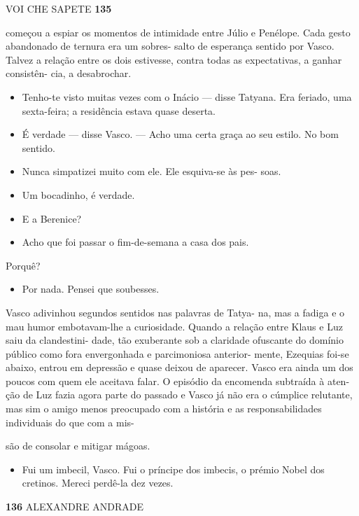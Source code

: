 VOI CHE SAPETE \textbf{135}

começou a espiar os momentos de intimidade entre Júlio e Penélope. Cada
gesto abandonado de ternura era um sobres- salto de esperança sentido
por Vasco. Talvez a relação entre os dois estivesse, contra todas as
expectativas, a ganhar consistên- cia, a desabrochar.

\begin{itemize}
\tightlist
\item
  Tenho-te visto muitas vezes com o Inácio --- disse Tatyana. Era
  feriado, uma sexta-feira; a residência estava quase deserta.
\item
  É verdade --- disse Vasco. --- Acho uma certa graça ao seu estilo. No
  bom sentido.
\item
  Nunca simpatizei muito com ele. Ele esquiva-se às pes- soas.
\item
  Um bocadinho, é verdade.
\item
  E a Berenice?
\item
  Acho que foi passar o fim-de-semana a casa dos pais.
\end{itemize}

Porquê?

\begin{itemize}
\tightlist
\item
  Por nada. Pensei que soubesses.
\end{itemize}

Vasco adivinhou segundos sentidos nas palavras de Tatya- na, mas a
fadiga e o mau humor embotavam-lhe a curiosidade. Quando a relação entre
Klaus e Luz saiu da clandestini- dade, tão exuberante sob a claridade
ofuscante do domínio público como fora envergonhada e parcimoniosa
anterior- mente, Ezequias foi-se abaixo, entrou em depressão e quase
deixou de aparecer. Vasco era ainda um dos poucos com quem ele aceitava
falar. O episódio da encomenda subtraída à aten- ção de Luz fazia agora
parte do passado e Vasco já não era o cúmplice relutante, mas sim o
amigo menos preocupado com a história e as responsabilidades individuais
do que com a mis-

são de consolar e mitigar mágoas.

\begin{itemize}
\tightlist
\item
  Fui um imbecil, Vasco. Fui o príncipe dos imbecis, o prémio Nobel dos
  cretinos. Mereci perdê-la dez vezes.
\end{itemize}

\textbf{136 }ALEXANDRE ANDRADE

